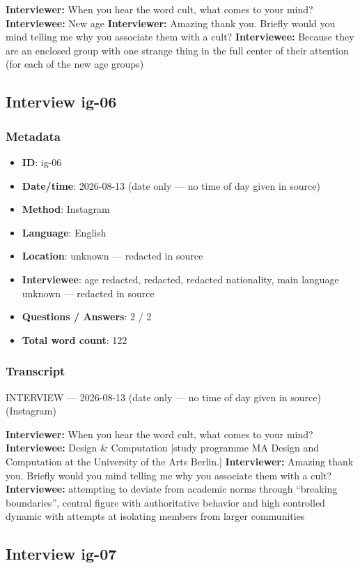 \textbf{Interviewer:} When you hear the word cult, what comes to your mind?
\textbf{Interviewee:} New age
\textbf{Interviewer:} Amazing thank you. Briefly would you mind telling me why you associate them with a cult?
\textbf{Interviewee:} Because they are an enclosed group with one strange thing in the full center of their attention (for each of the new age groups)

\subsection{Interview ig-06}\label{int:ig-06}
\subsubsection*{Metadata}
\begin{itemize}
  \item \textbf{ID}: ig-06
  \item \textbf{Date/time}: 2026-08-13 (date only — no time of day given in source)
  \item \textbf{Method}: Instagram
  \item \textbf{Language}: English
  \item \textbf{Location}: unknown — redacted in source
  \item \textbf{Interviewee}: age redacted, redacted, redacted nationality, main language unknown — redacted in source
  \item \textbf{Questions / Answers}: 2 / 2
  \item \textbf{Total word count}: 122
\end{itemize}
\subsubsection*{Transcript}
INTERVIEW — 2026-08-13 (date only — no time of day given in source) (Instagram)

\textbf{Interviewer:} When you hear the word cult, what comes to your mind?
\textbf{Interviewee:} Design \& Computation [study programme MA Design and Computation at the University of the Arts Berlin.]
\textbf{Interviewer:} Amazing thank you. Briefly would you mind telling me why you associate them with a cult?
\textbf{Interviewee:} attempting to deviate from academic norms through “breaking boundaries”, central figure with authoritative behavior and high controlled dynamic with attempts at isolating members from larger communities

\subsection{Interview ig-07}\label{int:ig-07}

